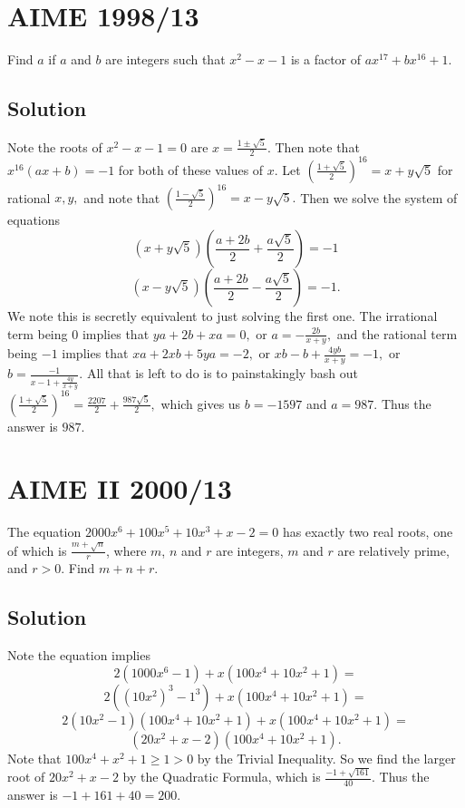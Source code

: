 \documentclass{article}
\begin{document}
\pagebreak\section{AIME 1998/13}

Find $a$ if $a$ and $b$ are integers such that $x^2 - x - 1$ is a factor of $ax^{17} + bx^{16} + 1$.

\subsection{Solution}

Note the roots of $x^2-x-1=0$ are $x=\frac{1\pm\sqrt{5}}{2}.$ Then note that $x^{16}(ax+b)=-1$ for both of these values of $x.$ Let $(\frac{1+\sqrt{5}}{2})^{16}=x+y\sqrt{5}$ for rational $x,y,$ and note that $(\frac{1-\sqrt{5}}{2})^{16}=x-y\sqrt{5}.$ Then we solve the system of equations
    \[(x+y\sqrt{5})(\frac{a+2b}{2}+\frac{a\sqrt{5}}{2})=-1\]
    \[(x-y\sqrt{5})(\frac{a+2b}{2}-\frac{a\sqrt{5}}{2})=-1.\]
    We note this is secretly equivalent to just solving the first one. The irrational term being $0$ implies that $ya+2b+xa=0,$ or $a=-\frac{2b}{x+y},$ and the rational term being $-1$ implies that $xa+2xb+5ya=-2,$ or $xb-b+\frac{4yb}{x+y}=-1,$ or $b=\frac{-1}{x-1+\frac{4y}{x+y}}.$ All that is left to do is to painstakingly bash out $(\frac{1+\sqrt{5}}{2})^{16}=\frac{2207}{2}+\frac{987\sqrt{5}}{2},$ which gives us $b=-1597$ and $a=987.$ Thus the answer is $987.$

\pagebreak\section{AIME II 2000/13}

The equation $2000x^6+100x^5+10x^3+x-2=0$ has exactly two real roots, one of which is $\frac{m+\sqrt{n}}r$, where $m$, $n$ and $r$ are integers, $m$ and $r$ are relatively prime, and $r>0$. Find $m+n+r$.

\subsection{Solution}

Note the equation implies
\[2(1000x^6-1)+x(100x^4+10x^2+1)=\]
\[2((10x^2)^3-1^3)+x(100x^4+10x^2+1)=\]
\[2(10x^2-1)(100x^4+10x^2+1)+x(100x^4+10x^2+1)=\]
\[(20x^2+x-2)(100x^4+10x^2+1).\]
Note that $100x^4+x^2+1\geq 1>0$ by the Trivial Inequality. So we find the larger root of $20x^2+x-2$ by the Quadratic Formula, which is $\frac{-1+\sqrt{161}}{40}.$ Thus the answer is $-1+161+40=200.$
\end{document}
